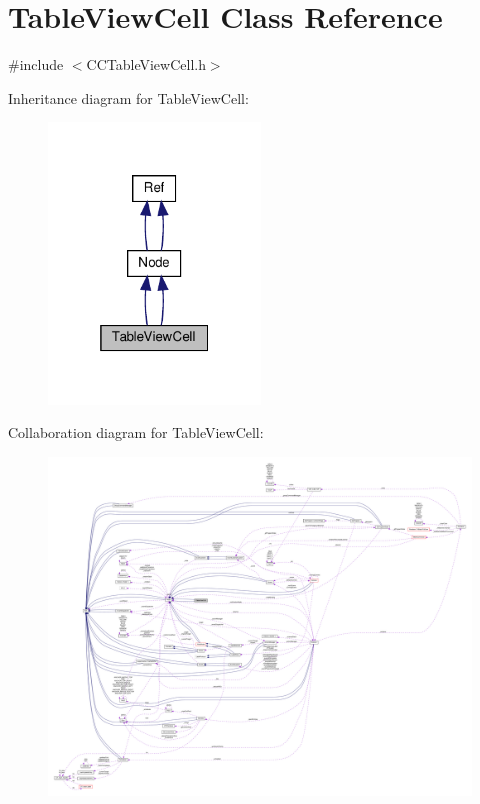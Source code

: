 \hypertarget{classTableViewCell}{}\section{Table\+View\+Cell Class Reference}
\label{classTableViewCell}


{\ttfamily \#include $<$C\+C\+Table\+View\+Cell.\+h$>$}



Inheritance diagram for Table\+View\+Cell\+:
\nopagebreak
\begin{figure}[H]
\begin{center}
\leavevmode
\includegraphics[width=160pt]{classTableViewCell__inherit__graph}
\end{center}
\end{figure}


Collaboration diagram for Table\+View\+Cell\+:
\nopagebreak
\begin{figure}[H]
\begin{center}
\leavevmode
\includegraphics[width=350pt]{classTableViewCell__coll__graph}
\end{center}
\end{figure}
